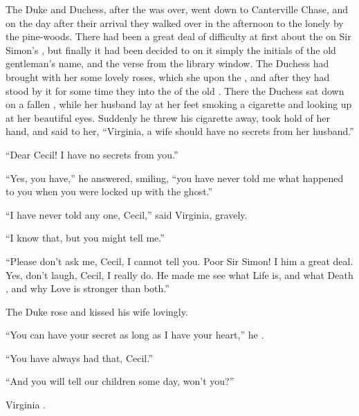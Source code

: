\documentclass[troisieme]{fiche}
\begin{document}
\begin{texte}
The Duke and Duchess, after the  was over, went
down to Canterville Chase, and on the day after their arrival they walked over in the afternoon
to the lonely  by the pine-woods. There had been a
great deal of difficulty at first about the 
on Sir Simon's , but finally it had been decided
to  on it simply the initials of the old gentleman's name, and
the verse from the library window. The Duchess had brought with her some lovely roses, which
she  upon the
, and after they had stood by it for some time they
 into the 
 of the old . There
the Duchess sat down on a fallen , while her husband lay at
her feet smoking a cigarette and looking up at her beautiful eyes. Suddenly he threw his
cigarette away, took hold of her hand, and said to her, ``Virginia, a wife should have no
secrets from her husband.''

``Dear Cecil! I have no secrets from you.''

``Yes, you have,'' he answered, smiling, ``you have never told me what happened to you when
you were locked up with the ghost.''

``I have never told any one, Cecil,'' said Virginia, gravely.

``I know that, but you might tell me.''

``Please don't ask me, Cecil, I cannot tell you. Poor Sir Simon! I  him a great deal. Yes, don't laugh, Cecil, I really do. He made
me see what Life is, and what Death , and why Love is
stronger than both.''

The Duke rose and kissed his wife lovingly.

``You can have your secret as long as I have your heart,'' he .

``You have always had that, Cecil.''

``And you will tell our children some day, won't you?''

Virginia .
\end{texte}
\end{document}
